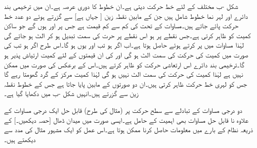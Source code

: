 شکل -ب مختلف  کے لئے خط حرکت دیتی ہے۔ان خطوط کا دوری عرصہ  ہے۔ان میں ترخیمی بند دائرے اور  لہر نما خطوط شامل ہیں جن کے مابین نقطہ زین [ جہاں  ہے] سے گزرتے ہوئے دو عدد خط حرکت  پائے جاتے ہیں۔مساوات  کے تحت  کی کم سے کم قیمت  ہے جس پر  اور  ہوں گے جو ساکن کمیت کو ظاہر کرتی ہے۔جس نقطے پر  ہو اس نقطے پر حرت کی سمت تبدیل ہو کر الٹ ہو جائے گی لہٰذا مساوات  میں  پر کرتے ہوئے  حاصل ہوتا ہے۔اب اگر  ہو تب  اور یوں  ہو گا۔اس طرح اگر  ہو تب  کی صورت میں کمیت کی حرکت کی سمت الٹ ہو گی اور  کی ان قیمتوں  کے لئے کمیت ارتیاش پذیر ہو گا۔ترخیمی بند دائرے اس ارتعاشی حرکت کو ظاہر کرتے ہیں۔اس کے برعکس  کی صورت میں  ممکن نہیں ہے لہٰذا کمیت کی حرکت کی سمت الٹ نہیں ہو گی لہٰذا کمیت مرکز کے گرد گھومتا رہے گا جس کو لہری خط حرکت ظاہر کرتی ہیں۔ان دو صورتوں کے مابین  پایا جاتا ہے جس کے خطوط نقطہ زین  سے گزرتے ہیں۔انہیں شکل -ب  میں دکھایا گیا ہے۔

دو درجی مساوات کے تبادلے سے سطح حرکت پر (مثال  کی طرح) قابل حل ایک درجی مساوات کے علاوہ نا قابل حل مساوات بھی اہمیت کے حامل ہے۔ایسی صورت میں میدان ڈھال [حصہ  دیکھیں۔] کے ذریعہ نظام کے بارے میں معلومات حاصل کرنا ممکن ہوتا ہے۔اس عمل کو ایک مشہور مثال کی مدد سے دیکھتے ہیں۔

